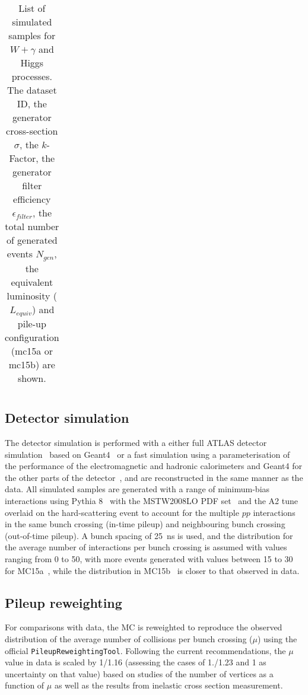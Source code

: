 \begin{sidewaystable}[!hp]
\begin{center}
{\begin{tabular}{llllllll}
\end{tabular}}
\end{center}
\caption{List of simulated samples for
  $W+\gamma$ and Higgs processes. The dataset ID, the generator
  cross-section $\sigma$, the $k$-Factor, the generator filter
  efficiency $\epsilon_{filter}$, the total number of
  generated events $N_{gen}$, the equivalent luminosity ($L_{equiv}$) and pile-up configuration (mc15a or mc15b) are shown.}
\label{tab:BGSamples3}
\end{sidewaystable}


\subsection{Detector simulation}

The detector simulation is performed with a either full ATLAS detector
simulation~\cite{Aad:2010ah} based on {\sc Geant4}~\cite{Agostinelli:2002hh} 
or a fast simulation using a parameterisation of the performance of the electromagnetic 
and hadronic calorimeters and {\sc Geant4} for the other parts of the detector~\cite{ATL-PHYS-PUB-2010-013},   
and are reconstructed in the same manner as the data. 
All simulated samples are generated with a range of minimum-bias
interactions using {\sc Pythia 8}~\cite{Sjostrand:2007gs} with the MSTW2008LO PDF set~\cite{Sherstnev:2007nd} and the A2 tune 
overlaid on the hard-scattering event to
account for the multiple $pp$ interactions in the same bunch
crossing (in-time pileup) and neighbouring bunch crossing (out-of-time pileup). 
A bunch spacing of 25~ns is used, and the distribution for the average number of
interactions per bunch crossing is assumed with values ranging from
0 to 50, with more events generated with values between 15 to 30 for MC15a~\cite{mc15atwiki}, 
while the distribution in MC15b~\cite{mc15btwiki} is closer to that observed in data. 

\subsection{Pileup reweighting}

For comparisons with data, the MC is reweighted to reproduce the observed distribution of the average number of collisions per bunch crossing ($\mu$) using the official {\tt PileupReweightingTool}.
Following the current recommendations, the $\mu$ value in data is scaled by 1/1.16 (assessing the cases of 1./1.23 and 1 as uncertainty on that value) based on studies of the number of vertices as a function of $\mu$ as well as the results from inelastic cross section measurement.

